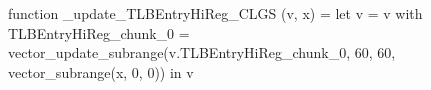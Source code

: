 function _update_TLBEntryHiReg_CLGS (v, x) = let v = { v with TLBEntryHiReg_chunk_0 = vector_update_subrange(v.TLBEntryHiReg_chunk_0, 60, 60, vector_subrange(x, 0, 0)) } in v
